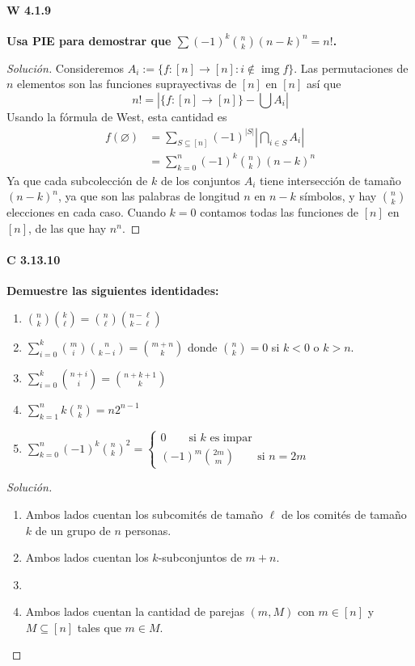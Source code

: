 \documentclass[spanish]{book}
\theoremstyle{definition}
\DeclareMathOperator{\img}{img}
\begin{document}
\paragraph{W 4.1.9} \textbf{Usa PIE para demostrar que $\sum(-1)^k{n\choose k}(n-k)^n=n!$.}
\begin{proof}[Solución]
	Consideremos $A_i:=\{f:[n]\to[n]:i\notin\img f\}$. Las permutaciones de $n$ elementos son las funciones suprayectivas de $[n]$ en $[n]$ así que 
	\[n!=\left|\{f:[n]\to[n]\}-\bigcup A_i\right|\]
	Usando la fórmula de West, esta cantidad es \begin{align*}
		f(\varnothing)&=\sum_{S\subseteq[n]}(-1)^{|S|}\left|\bigcap_{i\in S}A_i\right|\\
		&=\sum_{k=0}^n(-1)^k{n\choose k}(n-k)^n
	\end{align*}
	Ya que cada subcolección de $k$ de los conjuntos $A_i$ tiene intersección de tamaño $(n-k)^n$, ya que son las palabras de longitud $n$ en $n-k$ símbolos, y hay ${n\choose k}$ elecciones en cada caso. Cuando $k=0$ contamos todas las funciones de $[n]$ en $[n]$, de las que hay $n^n$.
\end{proof}
	
\paragraph{C 3.13.10} \textbf{Demuestre las siguientes identidades:}
\begin{enumerate}[label=(\alph*)]
	\item ${n\choose k}{k\choose\ell}={n\choose\ell}{n-\ell\choose k-\ell}$
	\item $\sum_{i=0}^k{m\choose i}{n\choose k-i}={m+n\choose k}$ donde ${n\choose k}=0$ si $k<0$ o $k>n$.
	\item $\sum_{i=0}^k{n+i\choose i}={n+k+1\choose k}$
	\item $\sum_{k=1}^nk{n\choose k}=n2^{n-1}$
	\item $\sum_{k=0}^{n}(-1)^k{n\choose k}^2=
	\begin{cases}
		0\qquad\text{si }k\text{ es impar}\\
		(-1)^m{2m\choose m}\qquad\text{si }n=2m
	\end{cases}$
\end{enumerate}
\begin{proof}[Solución]\leavevmode
	\begin{enumerate}[label=(\alph*)]
		\item Ambos lados cuentan los subcomités de tamaño $\ell$ de los comités de tamaño $k$ de un grupo de $n$ personas.
		\item Ambos lados cuentan los $k$-subconjuntos de $m+n$.
		\item 
		\item Ambos lados cuentan la cantidad de parejas $(m,M)$ con $m\in[n]$ y $M\subseteq [n]$ tales que $m\in M$.
	\end{enumerate}
\end{proof}
\end{document}
